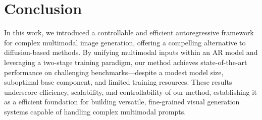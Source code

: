 \section{Conclusion}
\label{sec:conclusion}

In this work, we introduced a controllable and efficient autoregressive framework for complex multimodal image generation, offering a compelling alternative to diffusion-based methods.
By unifying multimodal inputs within an AR model and leveraging a two-stage training paradigm, our method achieves state-of-the-art performance on challenging benchmarks—despite a modest model size, suboptimal base component, and limited training resources.
These results underscore efficiency, scalability, and controllability of our method, establishing it as a efficient foundation for building versatile, fine-grained visual generation systems capable of handling complex multimodal prompts.





